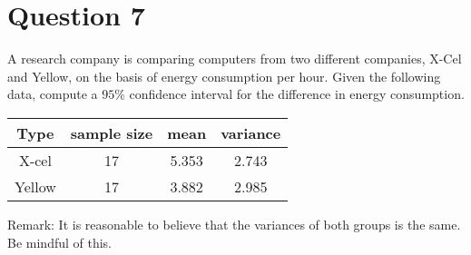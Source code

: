 \section*{Question 7}
A research company is comparing computers from two different companies, X-Cel and Yellow, on the basis of energy consumption per hour. Given the following data, compute a $95\%$ confidence interval for the difference in energy consumption.
\begin{center}
	\begin{tabular}{|c|c|c|c|}
		\hline
		Type & sample size & mean & variance \\ \hline
		X-cel & 17 & 5.353 & 2.743 \\ \hline
		Yellow & 17 & 3.882 & 2.985 \\ \hline
	\end{tabular}
\end{center}
Remark: It is reasonable to believe that the variances of both groups is the same. Be mindful of this.



